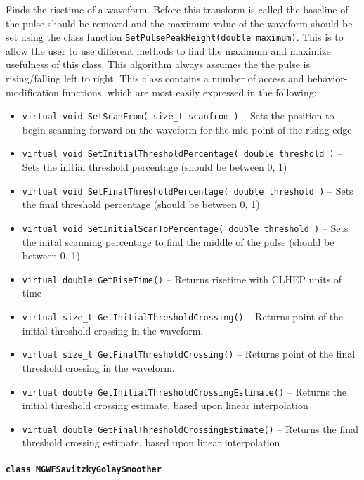 Finds the risetime of a waveform.  Before this transform is called the baseline of the pulse should be removed and the maximum value of the waveform should be set using the class function \lstinline!SetPulsePeakHeight(double maximum)!.  This is to allow the user to use different methods to find the maximum and maximize usefulness of this class. This algorithm always assumes the the pulse is rising/falling left to right.  This class contains a number of access and behavior-modification functions, which are most easily expressed in the following:
				\begin{itemize} 
				    \item \lstinline!virtual void SetScanFrom( size_t scanfrom )! -- Sets the position to begin scanning forward on the waveform for the mid point of the rising edge
				    \item \lstinline!virtual void SetInitialThresholdPercentage( double threshold )! --     Sets the initial threshold percentage (should be between 0, 1)
				    \item \lstinline!virtual void SetFinalThresholdPercentage( double threshold )! --     Sets the final threshold percentage (should be between 0, 1)
				    \item \lstinline!virtual void SetInitialScanToPercentage( double threshold )! -- Sets the inital scanning percentage to find the middle of the pulse (should be between 0, 1)
				    \item \lstinline!virtual double GetRiseTime()! --     Returns risetime with CLHEP units of time
				    \item \lstinline!virtual size_t GetInitialThresholdCrossing()! -- Returns point of the initial threshold crossing in the waveform.
				    \item \lstinline!virtual size_t GetFinalThresholdCrossing()! --     Returns point of the final threshold crossing in the waveform.
				    \item \lstinline!virtual double GetInitialThresholdCrossingEstimate()! --     Returns the initial threshold crossing estimate, based upon linear interpolation 
				    \item \lstinline!virtual double GetFinalThresholdCrossingEstimate()! -- Returns the final threshold crossing estimate, based upon linear interpolation 
				\end{itemize}				
			\paragraph{\lstinline!class MGWFSavitzkyGolaySmoother!} 

